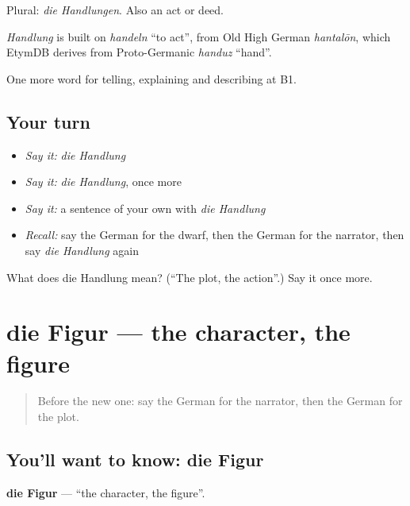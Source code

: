 Plural: \emph{die Handlungen}. Also an act or deed.

\begin{cousinweb}
\emph{Handlung} is built on \emph{handeln} \textquotedblleft{}to act\textquotedblright{}, from Old High German \emph{hantalōn}, which EtymDB derives from Proto-Germanic \emph{handuz} \textquotedblleft{}hand\textquotedblright{}.
\end{cousinweb}

\begin{grammarlens}[title={What you've built}]
One more word for telling, explaining and describing at B1.
\end{grammarlens}

\subsection*{Your turn}
\begin{itemize}
\raggedright
  \item \emph{Say it:} \emph{die Handlung}
  \item \emph{Say it:} \emph{die Handlung}, once more
  \item \emph{Say it:} a sentence of your own with \emph{die Handlung}
  \item \emph{Recall:} say the German for the dwarf, then the German for the narrator, then say \emph{die Handlung} again
\end{itemize}

\begin{tcolorbox}[breakable,colback=teal!4,colframe=teal!35!black,title={Before you move on}]
What does die Handlung mean? (\textquotedblleft{}The plot, the action\textquotedblright{}.) Say it once more.
\end{tcolorbox}
\section[die Figur]{die Figur — the character, the figure}

\label{lesson:GE-C316-figur}



\begin{quote}
Before the new one: say the German for the narrator, then the German for the plot.
\end{quote}

\subsection*{You'll want to know: die Figur}
\textbf{die Figur} — \textquotedblleft{}the character, the figure\textquotedblright{}.


